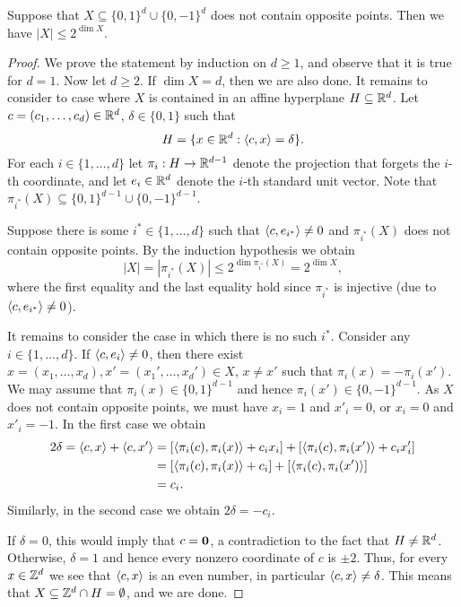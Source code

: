 \begin{lemma}
    \label{lemslice}
    Suppose that $X \subseteq \{0,1\}^d \cup \{0,-1\}^d$ does not contain opposite points.
    Then we have $|X| \le 2^{\dim X}$.
\end{lemma}
\begin{proof}
    We prove the statement by induction on $d \ge 1$, and observe that it is true for $d = 1$.
    Now let $d \ge 2$.
    If $\dim X = d$, then we are also done.
    It remains to consider to case where $X$ is contained in an affine hyperplane $H \subseteq {\mathbb{R}}^d$.
    Let $c = (c_1,\ldots,c_d) \in {\mathbb{R}}^d$, $\delta \in \{0,1\}$ such that $$H = \{ x \in {\mathbb{R}}^d : \langle c,x\rangle = \delta \}.$$
    For each $i \in \{1,\dots,d\}$ let $\pi_i : H \to {\mathbb{R}}^{d-1}$ denote the projection that forgets the $i$-th coordinate, and let $e_i \in {\mathbb{R}}^d$ denote the $i$-th standard unit vector. Note that $\pi_{i^*}(X) \subseteq \{0,1\}^{d-1} \cup \{0,-1\}^{d-1}$.

    Suppose there is some $i^* \in \{1,\dots,d\}$ such that $\langle c, e_{i^*}\rangle \ne 0$ and $\pi_{i^*}(X)$ does not contain opposite points.
    By the induction hypothesis we obtain
    \[
        |X| = |\pi_{i^*}(X)| \le 2^{\dim \pi_{i^*}(X)} = 2^{\dim X},
    \]
    where the first equality and the last equality hold since $\pi_{i^*}$ is injective (due to $\langle c, e_{i^*}\rangle \ne 0$).

    It remains to consider the case in which there is no such $i^*$.
    Consider any $i \in \{1,\dots,d\}$.
    If $\langle c, e_i \rangle \ne 0$, then there exist $x=(x_1,\ldots,x_d),x'=(x_1',\ldots,x_d') \in X$, $x \ne x'$ such that $\pi_i(x) = -\pi_i(x')$.
    We may assume that $\pi_i(x) \in \{0,1\}^{d-1}$ and hence $\pi_i(x') \in \{0,-1\}^{d-1}$.
    As $X$ does not contain opposite points, we must have $x_i = 1$ and $x'_i = 0$, or $x_i = 0$ and $x'_i = -1$.
    In the first case we obtain
    \begin{align*}
        2 \delta
        = \langle c,x\rangle + \langle c,x'\rangle
        & = [\langle \pi_i(c), \pi_i(x)\rangle + c_ix_i] + [\langle \pi_i(c), \pi_i(x')\rangle + c_ix'_i] \\
        & = [\langle \pi_i(c), \pi_i(x)\rangle + c_i] + [\langle\pi_i(c), \pi_i(x')\rangle] \\
        & = c_i.
    \end{align*}
    Similarly, in the second case we obtain $2 \delta = -c_i$.

    If $\delta = 0$, this would imply that $c = \mathbf{0}$, a contradiction to the fact that $H \ne {\mathbb{R}}^d$.
    Otherwise, $\delta = 1$ and hence every nonzero coordinate of $c$ is $\pm 2$.
    Thus, for every $x \in {\mathbb{Z}}^d$ we see that $\langle c,x\rangle$ is an even number, in particular $\langle c,x\rangle \ne \delta$.
    This means that $X \subseteq {\mathbb{Z}}^d \cap H = \emptyset$, and we are done.
\end{proof}

